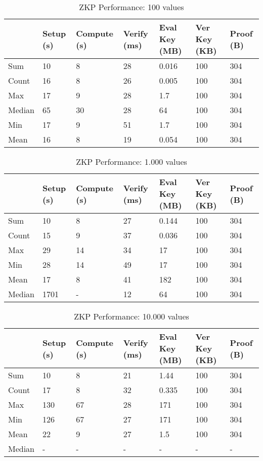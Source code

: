 \begin{table}[!htb]
\centering
\begin{tabular}{|l|l|l|l|l|l|l|}
\hline
 & Setup (s) & Compute (s) & Verify (ms) & Eval Key (MB) & Ver Key (KB) & Proof (B)  \\ \hline
 Sum & 10 & 8 & 28 & 0.016 & 100 & 304 \\ \hline
 Count & 16 & 8 & 26 & 0.005 & 100 & 304 \\ \hline
 Max & 17 & 9 & 28 & 1.7 & 100 & 304 \\ \hline
 Median & 65 & 30 & 28 & 64 & 100 & 304 \\ \hline
 Min & 17 & 9 & 51 & 1.7 & 100 & 304 \\ \hline
 Mean & 16 & 8 & 19 & 0.054 & 100 & 304 \\ \hline
\end{tabular}
\captionsetup{format=hang, justification=centering}
\caption{ZKP Performance: 100 values}
\label{table:zkp_01}
\end{table}

\begin{table}[!htb]
\centering
\begin{tabular}{|l|l|l|l|l|l|l|}
\hline
 & Setup (s) & Compute (s) & Verify (ms) & Eval Key (MB) & Ver Key (KB) & Proof (B)  \\ \hline
 Sum & 10 & 8 & 27 & 0.144 & 100 & 304 \\ \hline
 Count & 15 & 9 & 37 & 0.036 & 100 & 304 \\ \hline
 Max & 29 & 14 & 34 & 17 & 100 & 304 \\ \hline
 Min & 28 & 14 & 49 & 17 & 100 & 304 \\ \hline
 Mean & 17 & 8 & 41 & 182 & 100 & 304 \\ \hline
 Median & 1701 & - & 12 & 64 & 100 & 304 \\ \hline
\end{tabular}
\captionsetup{format=hang, justification=centering}
\caption{ZKP Performance: 1.000 values}
\label{table:zkp_02}
\end{table}

\begin{table}[!htb]
\centering
\begin{tabular}{|l|l|l|l|l|l|l|}
\hline
 & Setup (s) & Compute (s) & Verify (ms) & Eval Key (MB) & Ver Key (KB) & Proof (B)  \\ \hline
 Sum & 10 & 8 & 21 & 1.44 & 100 & 304 \\ \hline
 Count & 17 & 8 & 32 & 0.335 & 100 & 304 \\ \hline
 Max & 130 & 67 & 28 & 171 & 100 & 304 \\ \hline
 Min & 126 & 67 & 27 & 171 & 100 & 304 \\ \hline
 Mean & 22 & 9 & 27 & 1.5 & 100 & 304 \\ \hline
 Median & - & - & - & - & - & - \\ \hline
\end{tabular}
\captionsetup{format=hang, justification=centering}
\caption{ZKP Performance: 10.000 values}
\label{table:zkp_03}
\end{table}
